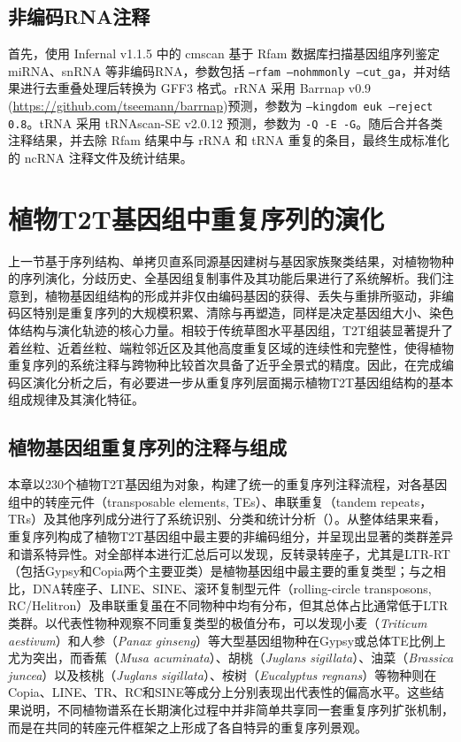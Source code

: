 \subsection{非编码RNA注释}
首先，使用 Infernal v1.1.5 中的 cmscan 基于 Rfam 数据库\cite{kalvari2021rfam}扫描基因组序列鉴定 miRNA、snRNA 等非编码RNA\cite{nawrocki2013infernal}，参数包括 \texttt{--rfam --nohmmonly --cut\_ga}，并对结果进行去重叠处理后转换为 GFF3 格式。rRNA 采用 Barrnap v0.9 (\url{https://github.com/tseemann/barrnap})预测，参数为 \texttt{--kingdom euk --reject 0.8}。tRNA 采用 tRNAscan-SE v2.0.12 预测\cite{chan2021trnascan}，参数为 \texttt{-Q -E -G}。随后合并各类注释结果，并去除 Rfam 结果中与 rRNA 和 tRNA 重复的条目，最终生成标准化的 ncRNA 注释文件及统计结果。

\section{植物T2T基因组中重复序列的演化}

上一节基于序列结构、单拷贝直系同源基因建树与基因家族聚类结果，对植物物种的序列演化，分歧历史、全基因组复制事件及其功能后果进行了系统解析。我们注意到，植物基因组结构的形成并非仅由编码基因的获得、丢失与重排所驱动，非编码区特别是重复序列的大规模积累、清除与再塑造，同样是决定基因组大小、染色体结构与演化轨迹的核心力量。相较于传统草图水平基因组，T2T组装显著提升了着丝粒、近着丝粒、端粒邻近区及其他高度重复区域的连续性和完整性，使得植物重复序列的系统注释与跨物种比较首次具备了近乎全景式的精度。因此，在完成编码区演化分析之后，有必要进一步从重复序列层面揭示植物T2T基因组结构的基本组成规律及其演化特征。

\subsection{植物基因组重复序列的注释与组成}

本章以230个植物T2T基因组为对象，构建了统一的重复序列注释流程，对各基因组中的转座元件（transposable elements, TEs）、串联重复（tandem repeats，TRs）及其他序列成分进行了系统识别、分类和统计分析（）。从整体结果来看，重复序列构成了植物T2T基因组中最主要的非编码组分，并呈现出显著的类群差异和谱系特异性。对全部样本进行汇总后可以发现，反转录转座子，尤其是LTR-RT（包括Gypsy和Copia两个主要亚类）是植物基因组中最主要的重复类型；与之相比，DNA转座子、LINE、SINE、滚环复制型元件（rolling-circle transposons, RC/Helitron）及串联重复虽在不同物种中均有分布，但其总体占比通常低于LTR类群。以代表性物种观察不同重复类型的极值分布，可以发现小麦（\textit{Triticum aestivum}）和人参（\textit{Panax ginseng}）等大型基因组物种在Gypsy或总体TE比例上尤为突出，而香蕉（\textit{Musa acuminata}）、胡桃（\textit{Juglans sigillata}）、油菜（\textit{Brassica juncea}）以及核桃（\textit{Juglans sigillata}）、桉树（\textit{Eucalyptus regnans}）等物种则在Copia、LINE、TR、RC和SINE等成分上分别表现出代表性的偏高水平。这些结果说明，不同植物谱系在长期演化过程中并非简单共享同一套重复序列扩张机制，而是在共同的转座元件框架之上形成了各自特异的重复序列景观。

